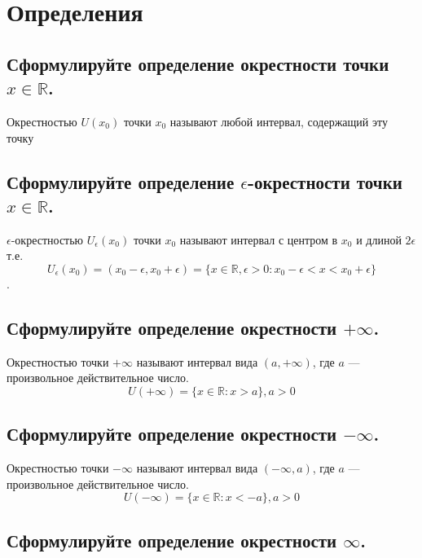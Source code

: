 




\section{Определения}
    \subsection{Сформулируйте определение окрестности точки $x \in \mathbb{R}$.}

    Окрестностью $U(x_0)$ точки $x_0$ называют любой интервал, содержащий эту точку

    \subsection{Сформулируйте определение $\epsilon$-окрестности точки $x \in \mathbb{R}$. }

    $\epsilon$-окрестностью $U_\epsilon(x_0)$ точки $x_0$ называют интервал с центром в 
    $x_0$ и длиной $2\epsilon$ т.е. $$U_\epsilon(x_0) = (x_0 - \epsilon, x_0 + \epsilon) = 
    \{x \in \mathbb{R},  \epsilon>0 : x_0 - \epsilon < x < x_0 + \epsilon\}$$.

    \subsection{Сформулируйте определение окрестности $+\infty$. }

    Окрестностью точки $+\infty$ называют интервал вида $(a, +\infty)$, где $a$ — произвольное действительное число.
    $$U(+\infty) = \{x \in \mathbb{R}: x > a\}, a > 0$$

    \subsection{Сформулируйте определение окрестности $-\infty$. }

    Окрестностью точки $-\infty$ называют интервал вида $(-\infty, a)$, где $a$ — произвольное действительное число.
    $$U(-\infty) = \{x \in \mathbb{R}: x < -a\}, a > 0$$

    \subsection{Сформулируйте определение окрестности $\infty$. }

